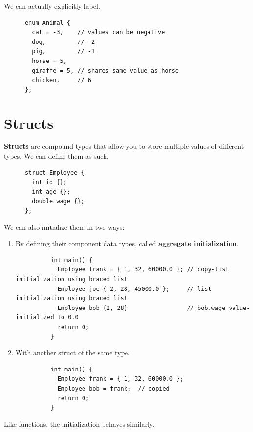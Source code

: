 \documentclass{article}
\newcounter{theorem}[section]
\newcounter{definition}[section]
\begin{document}
  \begin{theorem}
    \label{thm:integral-labels-can-be-explicitly-assigned}
    We can actually explicitly label. 
    \begin{lstlisting}
      enum Animal {
        cat = -3,    // values can be negative
        dog,         // -2
        pig,         // -1
        horse = 5,
        giraffe = 5, // shares same value as horse
        chicken,     // 6
      };
    \end{lstlisting}
  \end{theorem} 

\section{Structs} 

  \begin{definition}[Structs]
    \label{def:structs}
    \textbf{Structs} are compound types that allow you to store multiple values of different types. We can define them as such. 
    \begin{lstlisting}
      struct Employee {
        int id {};
        int age {};
        double wage {};
      };
    \end{lstlisting}
    We can also initialize them in two ways: 
    \begin{enumerate}
      \item By defining their component data types, called \textbf{aggregate initialization}. 
        \begin{lstlisting}
          int main() {
            Employee frank = { 1, 32, 60000.0 }; // copy-list initialization using braced list
            Employee joe { 2, 28, 45000.0 };     // list initialization using braced list
            Employee bob {2, 28}                 // bob.wage value-initialized to 0.0
            return 0;
          } 
        \end{lstlisting}

      \item With another struct of the same type. 
        \begin{lstlisting}
          int main() {
            Employee frank = { 1, 32, 60000.0 }; 
            Employee bob = frank;  // copied
            return 0;
          } 
        \end{lstlisting}
    \end{enumerate}
  \end{definition} 

  Like functions, the initialization behaves similarly. 
\end{document}
